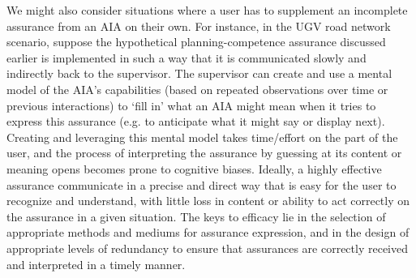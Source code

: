We might also consider situations where a user has to supplement an incomplete assurance from an AIA on their own. 
For instance, in the UGV road network scenario, suppose the hypothetical planning-competence assurance discussed earlier is implemented in such a way that it is communicated slowly and indirectly back to the supervisor. 
The supervisor can create and use a mental model of the AIA's capabilities (based on repeated observations over time or previous interactions) to `fill in' what an AIA might mean when it tries to express this assurance (e.g. to anticipate what it might say or display next).  
Creating and leveraging this mental model takes time/effort on the part of the user, and the process of interpreting the assurance by guessing at its content or meaning opens becomes prone to cognitive biases. %
Ideally, a highly effective assurance communicate in a precise and direct way that is easy for the user to recognize and understand, with little loss in content or ability to act correctly on the assurance in a given situation. 
The keys to efficacy lie in the selection of appropriate methods and mediums for assurance expression, and in the design of appropriate levels of redundancy to ensure that assurances are correctly received and interpreted in a timely manner.
